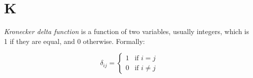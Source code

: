 \section*{K}
  \begin{definition}
  \label{def:kronecker}
    \textit{Kronecker delta function} is a function of two variables, usually
    integers, which is 1 if they are equal, and 0 otherwise.
    Formally:

    \begin{equation}
      \delta_{ij} = \begin{cases}
        1 & \text{if } i = j \\
        0 & \text{if } i \neq j
      \end{cases}
    \end{equation}
  \end{definition}